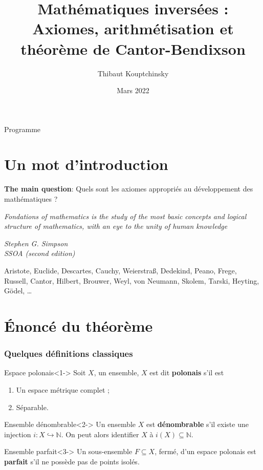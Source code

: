 \documentclass{beamer} %
\title[Axiomes et arithmétisation pour Cantor-Bendixson]{Mathématiques inversées : Axiomes, arithmétisation et théorème de Cantor-Bendixson}
\institute[LMAT2165]{Projet personnel et séminaire de master 1}
\author{Thibaut Kouptchinsky}
\date{Mars 2022}
\newcommand{\N}{\mathbb{N}}
\begin{document}
\begin{frame}
	\titlepage
\end{frame}


\begin{frame}{Programme}
    \tableofcontents
\end{frame}


\section{Un mot d'introduction}



\begin{frame}{\textbf{The main question}: Quels sont les axiomes appropriés au développement des mathématiques ? }

        \epigraph{\textit{Fondations of mathematics is the study of the most basic concepts and logical structure of mathematics, with an eye to the unity of human knowledge}}{\textit{Stephen G. Simpson \\ SSOA (second edition)}}
\pause Aristote, Euclide, Descartes, Cauchy, Weierstraß, Dedekind, Peano, Frege, Russell, Cantor, Hilbert, Brouwer, Weyl, von Neumann, Skolem, Tarski, Heyting, Gödel, \dots 

\end{frame}


%
\section{\'Enoncé du théorème}
\begin{frame}
    \frametitle{Quelques définitions classiques}
    \begin{block}{Espace polonais}<1->
        Soit $X$, un ensemble, $X$ est dit \textbf{polonais} s'il est \begin{enumerate}
            \item Un espace métrique complet ;
            \item Séparable.
        \end{enumerate}
    \end{block}
    \begin{block}{Ensemble dénombrable}<2->
        Un ensemble $X$ est \textbf{dénombrable} s'il existe une injection $i : X \hookrightarrow \N$. On peut alors identifier $X$ à $i(X) \subseteq \N$.
    \end{block}
    \begin{block}{Ensemble parfait}<3->
        Un sous-ensemble $F \subseteq X$, fermé, d'un espace polonais est \textbf{parfait} s'il ne possède pas de points isolés.
    \end{block}
    
\end{frame}
\end{document}
